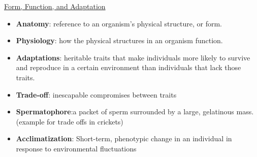 \documentclass[12pt,letterpaper]{article}
\begin{document}
\hypertarget{39.1}{}
\begin{secbox}{\hyperlink{39}{Form, Function, and Adaptation}}{
    \begin{itemize}
        \item\textbf{Anatomy}: reference to an organism’s physical structure, or form.
        \item\textbf{Physiology}: how the physical structures in an organism function.
        \item\textbf{Adaptations}: heritable traits that make individuals more likely to survive and reproduce in a certain environment than individuals that lack those traits.
        \item\textbf{Trade-off}: inescapable compromises between traits
        \item\textbf{Spermatophore}:a packet of sperm surrounded by a large, gelatinous mass. (example for trade offs in crickets)
        \item\textbf{Acclimatization}: Short-term, phenotypic change in an individual in response to environmental fluctuations
    \end{itemize}    
}\end{secbox}
\end{document}

